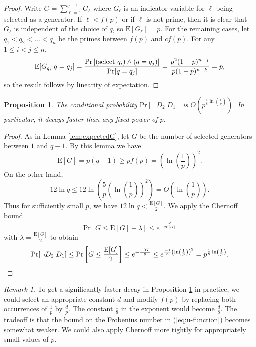 \documentclass[11pt]{amsart}
\newtheorem{proposition}[theorem]{Proposition}
\theoremstyle{definition}
\theoremstyle{remark}
\newtheorem*{rem}{Remark}
\def\Pr{\ensuremath{\mathrm{Pr}}}
\def\EE{\ensuremath{\mathrm{E}}}
\begin{document}
\begin{proof}
  Write $G = \sum_{\ell=1}^{q-1} G_\ell$ where $G_\ell$ is an indicator variable for $\ell$ being selected as a generator. If $\ell < f(p)$ or if $\ell$ is not prime, then it is clear that $G_\ell$ is independent of the choice of $q$, so $\EE[G_{\ell}]=p$. For the remaining cases, let $q_1 < q_2 < \dots < q_n$ be the primes between $f(p)$ and $cf(p)$. For any $1 \leq i < j \leq n$,
  \[ \EE[G_{q_i} | q = q_j] = \frac{\Pr\left[ (\textup{select }q_i) \land (q = q_j)\right]}{\Pr[q = q_j]} = \frac{p^2(1-p)^{n-j}}{p(1-p)^{n-k}} = p,\]
  so the result follows by linearity of expectation. 
\end{proof}

\begin{proposition} \label{prop:notD2} The conditional probability $\Pr[\lnot D_2 | D_1]$ is $O\left(p^{\frac{1}{8} \ln \left( \frac{1}{p} \right)}\right)$. In particular, it decays faster than any fixed power of $p$. 
\end{proposition}

\begin{proof}
As in Lemma \ref{lem:expectedG}, let $G$ be the number of selected generators between $1$ and $q-1$. By this lemma we have 
\[\EE[G] = p(q-1)  \geq pf(p) = \left( \ln \left( \frac{1}{p} \right) \right)^2.\]
On the other hand,
\[ 12 \ln q \leq 12 \ln \left( \frac{5}{p} \left( \ln \left( \frac{1}{p} \right) \right)^2 \right) = O \left(\ln \left( \frac{1}{p} \right)  \right).\]
Thus for sufficiently small $p$, we have $12 \ln q < \frac{\EE[G]}{2}$. 
We apply the Chernoff bound
\[        \Pr[G \leq \EE[G] - \lambda] \leq e^{-\frac{\lambda^2}{2\EE[G]}} \]
with $\lambda = \frac{\EE[G]}{2}$ to obtain
\[ \Pr[\lnot D_2 | D_1] \leq \Pr\left[G \leq \frac{\EE[G]}{2}\right] \leq e^{-\frac{\EE[G]}{8}} \leq e^{\frac{-1}{8} \left( \ln \left( \frac{1}{p} \right) \right)^2} = p^{\frac{1}{8} \ln \left( \frac{1}{p} \right)}. \qedhere \]
\end{proof}

\begin{rem}
To get a significantly faster decay in Proposition \ref{prop:notD2} in practice, we could select an appropriate constant $d$ and modify $f(p)$ by replacing both occurrences of $\frac{1}{p}$ by $\frac{d}{p}$. The constant $\frac{1}{8}$ in the exponent would become $\frac{d}{8}$. The tradeoff is that the bound on the Frobenius number in (\ref{eq:u-function}) becomes somewhat weaker. We could also apply Chernoff more tightly for appropriately small values of $p$. 
\end{rem}
\end{document}

